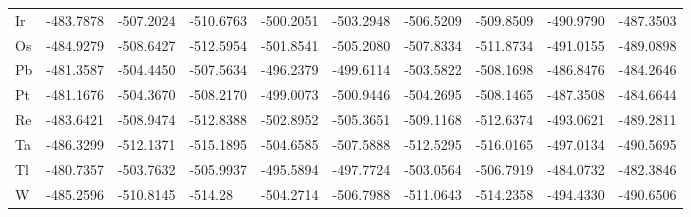 \documentclass[a4paper, 12pt]{article}
\begin{document}
\begin{table}[htbp]
{\begin{tabular}{l *{9}{l}}
      Ir & -483.7878 & -507.2024 & -510.6763 & -500.2051 & -503.2948 & -506.5209 & -509.8509 & -490.9790 & -487.3503 \\
      Os & -484.9279 & -508.6427 & -512.5954 & -501.8541 & -505.2080 & -507.8334 & -511.8734 & -491.0155 & -489.0898 \\
      Pb & -481.3587 & -504.4450 & -507.5634 & -496.2379 & -499.6114 & -503.5822 & -508.1698 & -486.8476 & -484.2646 \\
      Pt & -481.1676 & -504.3670 & -508.2170 & -499.0073 & -500.9446 & -504.2695 & -508.1465 & -487.3508 & -484.6644 \\
      Re & -483.6421 & -508.9474 & -512.8388 & -502.8952 & -505.3651 & -509.1168 & -512.6374 & -493.0621 & -489.2811 \\
      Ta & -486.3299 & -512.1371 & -515.1895 & -504.6585 & -507.5888 & -512.5295 & -516.0165 & -497.0134 & -490.5695 \\
      Tl & -480.7357 & -503.7632 & -505.9937 & -495.5894 & -497.7724 & -503.0564 & -506.7919 & -484.0732 & -482.3846 \\
      W  & -485.2596 & -510.8145 & -514.28   & -504.2714 & -506.7988 & -511.0643 & -514.2358 & -494.4330 & -490.6506 \\
      \bottomrule
    \end{tabular}
  }
\end{table}
\end{document}
